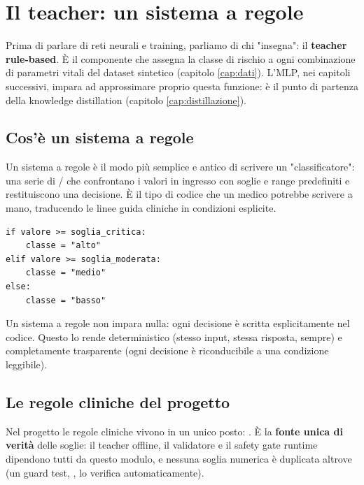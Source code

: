 \chapter{Il teacher: un sistema a regole}\label{cap:teacher}


Prima di parlare di reti neurali e training, parliamo di chi "insegna": il
\textbf{teacher rule-based}. È il componente che assegna la classe di rischio
a ogni combinazione di parametri vitali del dataset sintetico (capitolo
\ref{cap:dati}). L'MLP, nei capitoli successivi, impara ad approssimare
proprio questa funzione: è il punto di partenza della knowledge distillation
(capitolo \ref{cap:distillazione}).

\section{Cos'è un sistema a regole}\label{sec:cos-e-sistema-a-regole}

Un sistema a regole è il modo più semplice e antico di scrivere un
"classificatore": una serie di / che confrontano i
valori in ingresso con soglie e range predefiniti e restituiscono una
decisione. È il tipo di codice che un medico potrebbe scrivere a mano,
traducendo le linee guida cliniche in condizioni esplicite.

\begin{lstlisting}[caption={La struttura di un sistema a regole (pseudocodice)}]
if valore >= soglia_critica:
    classe = "alto"
elif valore >= soglia_moderata:
    classe = "medio"
else:
    classe = "basso"
\end{lstlisting}

Un sistema a regole non impara nulla: ogni decisione è scritta esplicitamente
nel codice. Questo lo rende deterministico (stesso input, stessa risposta,
sempre) e completamente trasparente (ogni decisione è riconducibile a una
condizione leggibile).

\section{Le regole cliniche del progetto}\label{sec:regole-cliniche-progetto}

Nel progetto le regole cliniche vivono in un unico posto:
. È la
\textbf{fonte unica di verità} delle soglie: il teacher offline, il
validatore e il safety gate runtime dipendono tutti da questo modulo, e
nessuna soglia numerica è duplicata altrove (un guard test,
, lo verifica automaticamente).

